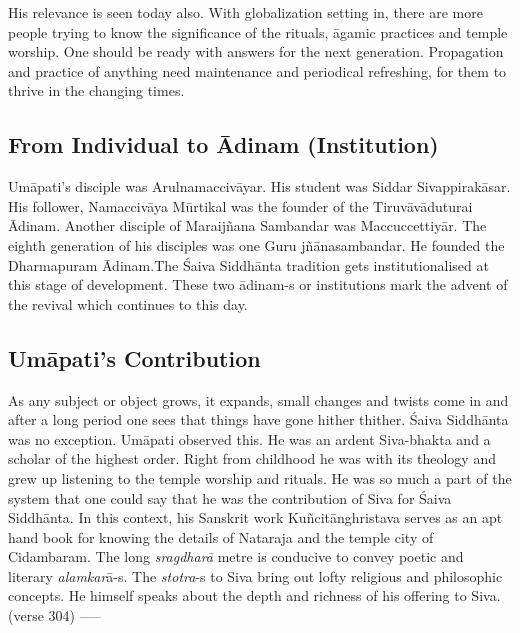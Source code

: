 His relevance is seen today also. With globalization setting in, there are more people trying to know the significance of the rituals, āgamic practices and temple worship. One should be ready with answers for the next generation. Propagation and practice of anything need maintenance and periodical refreshing, for them to thrive in the changing times.


\subsection{From Individual to Ādinam (Institution)}

Umāpati’s disciple was Arulnamaccivāyar. His student was Siddar Sivappirakāsar. His follower, Namaccivāya Mūrtikal was the founder of the Tiruvāvāduturai Ādinam. Another disciple of Maraijñana Sambandar was Maccuccettiyār. The eighth generation of his disciples was one Guru jñānasambandar. He founded the Dharmapuram Ādinam.The Śaiva Siddhānta tradition gets institutionalised at this stage of development. These two ādinam-s or institutions mark the advent of the revival which continues to this day.


\subsection{Umāpati's Contribution}

As any subject or object grows, it expands, small changes and twists come in and after a long period one sees that things have gone hither thither. Śaiva Siddhānta was no exception. Umāpati observed this. He was an ardent Siva-bhakta and a scholar of the highest order. Right from childhood he was with its theology and grew up listening to the temple worship and rituals. He was so much a part of the system that one could say that he was the contribution of Siva for Śaiva Siddhānta. In this context, his Sanskrit work Kuñcitānghristava serves as an apt hand book for knowing the details of Nataraja and the temple city of Cidambaram. The long \textit{sragdharā} metre is conducive to convey poetic and literary \textit{alamkar}ā-s. The \textit{stotra}-s to Siva bring out lofty religious and philosophic concepts. He himself speaks about the depth and richness of his offering to Siva. (verse 304) -----

